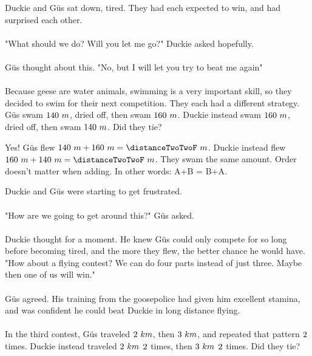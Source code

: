 {Duckie and G{\"u}s sat down, tired. They had each expected to win, and had surprised each other. 
\paragraph{} "What should we do? Will you let me go?" Duckie asked hopefully. \paragraph{} G{\"u}s thought about this. "No, but I will let you try to beat me again" 
\paragraph{} Because geese are water animals, swimming is a very important skill, so they decided to swim for their next competition. They each had a different strategy. G{\"u}s swam $140~m$, dried off, then swam $160~m$. Duckie instead swam $160~m$, dried off, then swam $140~m$. Did they tie?}
{Yes! G{\"u}s flew $\distanceTwoTwoO~m + \distanceTwoTwoTw~m = \distanceTwoTwoF~m$. Duckie instead flew $\distanceTwoTwoTw~m + \distanceTwoTwoO~m = \distanceTwoTwoF~m$. They swam the same amount.}
{Order doesn't matter when adding. In other words: A+B = B+A.}
{}
{Duckie and G{\"u}s were starting to get frustrated. 
\paragraph{} "How are we going to get around this?" G{\"u}s asked.
\paragraph{} Duckie thought for a moment. He knew G{\"u}s could only compete for so long before becoming tired, and the more they flew, the better chance he would have. "How about a flying contest? We can do four parts instead of just three. Maybe then one of us will win."
\paragraph{} G{\"u}s agreed. His training from the goosepolice had given him excellent stamina, and was confident he could beat Duckie in long distance flying. 
\paragraph{} In the third contest, G{\"u}s traveled $2~km$, then $3~km$, and repeated that pattern $2$ times. Duckie instead traveled $2~km$ $2$ times, then $3~km$ $2$ times. Did they tie?}
